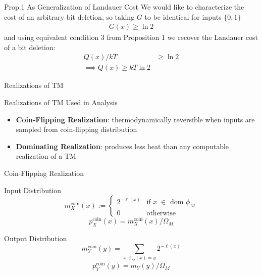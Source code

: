 \documentclass{beamer}
\begin{document}
\begin{frame}{Prop.1 As Generalization of Landauer Cost}
We would like to characterize the cost of an arbitrary bit deletion, so taking $G$ to be identical for inputs $\{0,1\}$
\begin{align*}
    G(x) \ge \ln 2
\end{align*}
and using equivalent condition 3 from Proposition 1 we recover the Landauer cost of a bit deletion:
\begin{align*}
    Q(x)/kT &\ge \ln 2\\
    \implies Q(x) \ge kT \ln 2
\end{align*}
\end{frame}


\begin{frame}{Realizations of TM}
\begin{block}{Realizations of TM Used in Analysis}
    \begin{itemize}
        \item \textbf{Coin-Flipping Realization}: thermodynamically reversible when inputs are sampled from coin-flipping distribution
        \item \textbf{Dominating Realization}: produces less heat than any computable realization of a TM
    \end{itemize}
\end{block}
\end{frame}




\begin{frame}{Coin-Flipping Realization}
    \begin{block}{Input Distribution}
     \begin{equation*}
        m_X^\text{coin}(x) := \begin{cases} 2^{-\ell(x)} &\text{if $x\;\in$ dom $\phi_M$}\\ 0 &\text{otherwise}\end{cases}
    \end{equation*}
    \begin{equation*}
        p_X^\text{coin}(x) = m_X^\text{coin}(x)/\Omega_M
    \end{equation*}
    \end{block}
    \begin{block}{Output Distribution}
    \begin{equation*}
        m_Y^\text{coin}(y) = \sum_{x:\phi_M(x) = y} 2^{-\ell(x)}
    \end{equation*}
    \begin{equation*}
        p_Y^\text{coin}(y) = m_Y(y) / \Omega_M
    \end{equation*}
    \end{block}
\end{frame}
\end{document}
